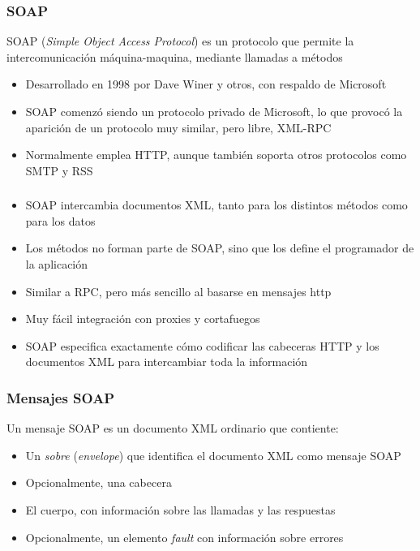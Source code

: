 \documentclass[ucs]{beamer}
\begin{document}
\begin{frame}[fragile]
\frametitle{SOAP}
SOAP (\emph{Simple Object Access Protocol}) es un protocolo que permite la intercomunicación
máquina-maquina,
mediante llamadas a métodos

\begin{itemize}
\item
Desarrollado en 1998 por Dave Winer y otros, con respaldo de Microsoft
\item
SOAP comenzó siendo un protocolo privado de Microsoft, lo que provocó
la aparición de un protocolo muy similar, pero libre, XML-RPC

\item
Normalmente emplea HTTP, aunque también soporta otros protocolos como SMTP y RSS

\end{itemize}
\end{frame}
\begin{frame}[fragile]
\frametitle{}
\begin{itemize}
\item
SOAP intercambia documentos XML, tanto para los distintos métodos como para los datos
\item
Los métodos no forman parte de SOAP, sino que los define el programador 
de la aplicación 
\item
Similar a RPC, pero más sencillo al basarse en mensajes http
\item
Muy fácil integración con proxies y cortafuegos
\item

SOAP especifica exactamente cómo codificar las cabeceras HTTP y los documentos XML para
intercambiar toda la información
\end{itemize}
\end{frame}


\begin{frame}[fragile]
\frametitle{Mensajes SOAP}
Un mensaje SOAP es un documento XML ordinario que contiente:
\begin{itemize}
\item
Un \emph{sobre} (\emph{envelope}) que identifica el documento XML como mensaje SOAP
\item
Opcionalmente, una cabecera
\item
El cuerpo, con información sobre las llamadas y las respuestas
\item
Opcionalmente, un elemento \emph{fault} con información sobre errores
\end{itemize}

\end{frame}
\end{document}

